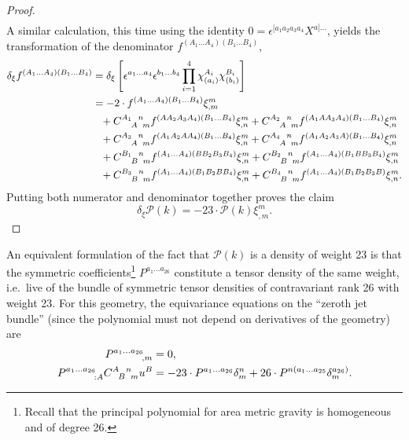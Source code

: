 \begin{proof}
\begin{equation}
\begin{aligned}
    \end{aligned}
  \end{equation}
  A similar calculation, this time using the identity $0 = \epsilon^{\lbrack a_1a_2a_3a_4} X^{a\rbrack\dots}$, yields the transformation of the denominator $f^{(A_1\dots A_4)(B_1\dots B_4)}$,
  \begin{equation}
    \begin{aligned}
      \delta_\xi f^{(A_1\dots A_4)(B_1\dots B_4)} &{} = \delta_\xi\left\lbrack \epsilon^{a_1\dots a_4} \epsilon^{b_1\dots b_4} \prod_{i=1}^4 \chi^{A_i}_{(a_i)} \chi^{B_i}_{(b_i)} \right\rbrack \\
                                                  &{} = -2 \cdot f^{(A_1\dots A_4)(B_1\dots B_4)} \xi^m_{,m} \\
                                                  &{} \hphantom{=} + \gmc{A_1}{A}{n}{m} f^{(AA_2A_3A_4)(B_1\dots B_4)} \xi^m_{,n} + \gmc{A_2}{A}{n}{m} f^{(A_1AA_3A_4)(B_1\dots B_4)} \xi^m_{,n} \\
                                                  &{} \hphantom{=} + \gmc{A_3}{A}{n}{m} f^{(A_1A_2AA_4)(B_1\dots B_4)} \xi^m_{,n} + \gmc{A_4}{A}{n}{m} f^{(A_1A_2A_3A)(B_1\dots B_4)} \xi^m_{,n} \\
                                                  &{} \hphantom{=} + \gmc{B_1}{B}{n}{m} f^{(A_1\dots A_4)(BB_2B_3B_4)} \xi^m_{,n} + \gmc{B_2}{B}{n}{m} f^{(A_1\dots A_4)(B_1BB_3B_4)} \xi^m_{,n} \\
                                                  &{} \hphantom{=} + \gmc{B_3}{B}{n}{m} f^{(A_1\dots A_4)(B_1B_2BB_4)} \xi^m_{,n} + \gmc{B_4}{B}{n}{m} f^{(A_1\dots A_4)(B_1B_2B_3B)} \xi^m_{,n}.
    \end{aligned}
  \end{equation}
  Putting both numerator and denominator together proves the claim
  \begin{equation}
    \delta_\xi \mathcal P(k) = -23 \cdot \mathcal P(k) \xi^m_{,m}.
  \end{equation}
\end{proof}
An equivalent formulation of the fact that $\mathcal P(k)$ is a density of weight 23 is that the symmetric coefficients\footnote{Recall that the principal polynomial for area metric gravity is homogeneous and of degree 26.} $P^{a_1\dots a_{26}}$ constitute a tensor density of the same weight, i.e.~live of the bundle of symmetric tensor densities of contravariant rank 26 with weight 23. For this geometry, the equivariance equations on the ``zeroth jet bundle'' (since the polynomial must not depend on derivatives of the geometry) are
\begin{equation}\label{polynomial_equivariance_eqns}
  \begin{aligned}
    P^{a_1\dots a_{26}}_{\hphantom{a_1\dots a_{26}},m} &{} = 0, \\
    P^{a_1\dots a_{26}}_{\hphantom{a_1\dots a_{26}}:A} \gmc{A}{B}{n}{m} u^B &{} = - 23\cdot P^{a_1\dots a_{26}} \delta^n_m + 26\cdot P^{n(a_1\dots a_{25}} \delta^{a_{26})}_m.
  \end{aligned}
\end{equation}


